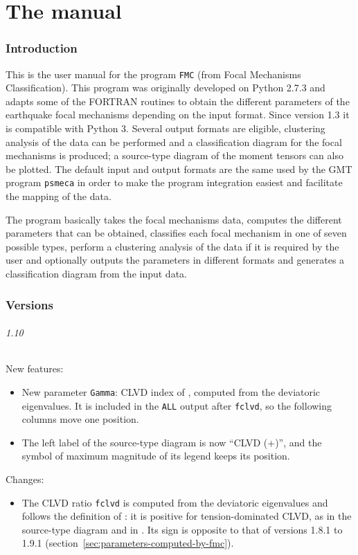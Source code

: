 \documentclass[11pt,a4paper,english]{article}
\numberwithin{equation}{section}
\begin{document}
\newpage{}

\part{The manual}

\section{Introduction}

This is the user manual for the program \texttt{FMC} (from Focal Mechanisms
Classification). This program was originally developed on Python 2.7.3
and adapts some of the \citet{gasp03} FORTRAN routines to obtain
the different parameters of the earthquake focal mechanisms depending
on the input format. Since version 1.3 it is compatible with Python
3. Several output formats are eligible, clustering analysis of the
data can be performed and a classification diagram for the focal mechanisms
is produced; a source-type diagram of the moment tensors can also be plotted. The default input and output formats are the same used
by the GMT program \texttt{psmeca} in order to make the program integration
easiest and facilitate the mapping of the data.

The program basically takes the focal mechanisms data, computes the
different parameters that can be obtained, classifies each focal mechanism
in one of seven possible types, perform a clustering analysis of the
data if it is required by the user and optionally outputs the parameters
in different formats and generates a classification diagram from the
input data.

\section{Versions}
\label{sec:versions}

\paragraph{1.10}

New features:
\begin{itemize}
\item New parameter \texttt{Gamma}: CLVD index of \citet{kaga85}, computed from the deviatoric eigenvalues. It is included in the \texttt{ALL} output after \texttt{fclvd}, so the following columns move one position.
\item The left label of the source-type diagram is now ``CLVD (+)'', and the symbol of maximum magnitude of its legend keeps its position.
\end{itemize}
Changes:
\begin{itemize}
\item The CLVD ratio \texttt{fclvd} is computed from the deviatoric eigenvalues and follows the definition of \citet{froh99}: it is positive for tension-dominated CLVD, as in the source-type diagram and in \citet{vavr15}. Its sign is opposite to that of versions 1.8.1 to 1.9.1 (section~\ref{sec:parameters-computed-by-fmc}).
\end{itemize}
\end{document}

